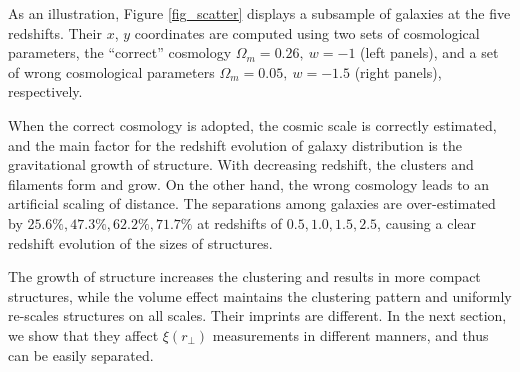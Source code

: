 \documentclass[iop]{emulateapj}
\newcommand{\hMsun}{{\ifmmode{h^{-1}{\rm
        {M_{\odot}}}}\else{$h^{-1}{\rm{M_{\odot}}}$~}\fi}}
\begin{document}
As an illustration, Figure \ref{fig_scatter} displays a subsample of galaxies at the five redshifts.
Their $x$, $y$ coordinates are computed using two sets of cosmological parameters,
the ``correct'' cosmology $\Omega_m=0.26,\ w=-1$ (left panels),
and a set of wrong cosmological parameters $\Omega_m=0.05,\ w=-1.5$ (right panels), respectively.

When the correct cosmology is adopted, the cosmic scale is correctly estimated,
and the main factor for the redshift evolution of galaxy distribution is the gravitational growth of structure.
With decreasing redshift, the clusters and filaments form and grow.
On the other hand, the wrong cosmology leads to an artificial scaling of distance.
The separations among galaxies are over-estimated by 
$25.6\%,47.3\%,62.2\%,71.7\%$ at redshifts of $0.5,1.0,1.5,2.5$,
causing a clear redshift evolution of the sizes of structures.

The growth of structure increases the clustering and results in more compact structures,
while the volume effect maintains the clustering pattern and uniformly re-scales structures on all scales.
Their imprints are different.
In the next section, we show that they affect $\xi(r_{\bot})$ measurements in different manners, 
and thus can be easily separated.





\end{document}
